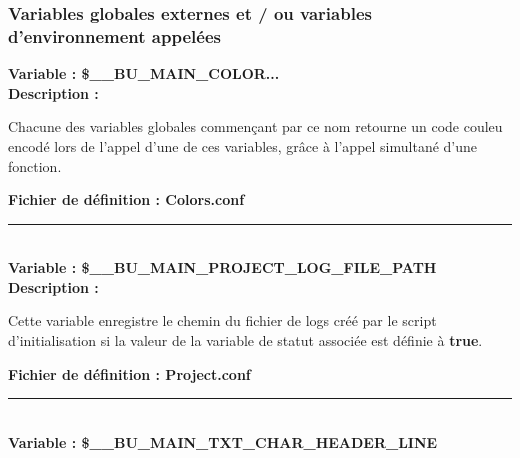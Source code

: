 \documentclass[a4paper,10pt]{article}
\begin{document}
\color{sec3}
\subsubsection{Variables globales externes et / ou variables d'environnement appelées}\color{text}

\textbf{Variable : \color{vars}\$\_\_BU\_MAIN\_COLOR...}\\[1\baselineskip]

\textbf{Description :}

\begin{justify}
    Chacune des variables globales commençant par ce nom retourne un code couleu encodé lors de l'appel d'une de ces variables, grâce à l'appel simultané d'une fonction.
\end{justify}

\textbf{Fichier de définition : \color{path}Colors.conf}\\[1\baselineskip]




\color{vars}\par\noindent\rule{\textwidth}{0.4pt}\color{text}\\[1\baselineskip]

\textbf{Variable : \color{vars}\$\_\_BU\_MAIN\_PROJECT\_LOG\_FILE\_PATH}\\[1\baselineskip]

\textbf{Description :}

\begin{justify}
    Cette variable enregistre le chemin du fichier de logs créé par le script d'initialisation si la valeur de la variable de statut associée est définie à \textbf{\color{cmds}true}.
\end{justify}

\textbf{Fichier de définition : \color{path}Project.conf} \\[1\baselineskip]




\color{vars}\par\noindent\rule{\textwidth}{0.4pt}\color{text}\\[1\baselineskip]

\textbf{Variable : \color{vars}\$\_\_BU\_MAIN\_TXT\_CHAR\_HEADER\_LINE}\\[1\baselineskip]
\end{document}
